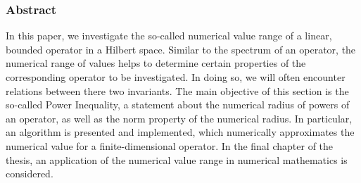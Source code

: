 
\subsubsection*{Abstract}

    In this paper, we investigate the so-called numerical value range of a linear, bounded operator in a Hilbert space. Similar to the spectrum of an operator, the numerical range of values helps to determine certain properties of the corresponding operator to be investigated. In doing so, we will often encounter relations between there two invariants. The main objective of this section is the so-called Power Inequality, a statement about the numerical radius of powers of an operator, as well as the norm property of the numerical radius. In particular, an algorithm is presented and implemented, which numerically approximates the numerical value for a finite-dimensional operator. In the final chapter of the thesis, an application of the numerical value range in numerical mathematics is considered.

